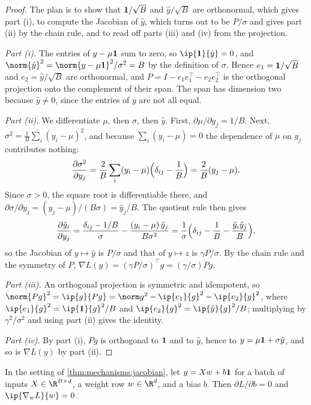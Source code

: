 \begin{refsection}
\begin{proof}
The plan is to show that $\mathbf{1}/\sqrt B$ and $\hat y/\sqrt B$ are orthonormal, which gives part (i), to compute the Jacobian of $\hat y$, which turns out to be $P/\sigma$ and gives part (ii) by the chain rule, and to read off parts (iii) and (iv) from the projection.

\emph{Part (i).} The entries of $y-\mu\mathbf{1}$ sum to zero, so $\ip{\mechanismsones}{\hat y}=0$, and $\norm{\hat y}^2=\norm{y-\mu\mechanismsones}^2/\sigma^2=B$ by the definition of $\sigma$. Hence $e_1=\mathbf{1}/\sqrt B$ and $e_2=\hat y/\sqrt B$ are orthonormal, and $P=I-e_1e_1^\top-e_2e_2^\top$ is the orthogonal projection onto the complement of their span. The span has dimension two because $\hat y\neq0$, since the entries of $y$ are not all equal.

\emph{Part (ii).} We differentiate $\mu$, then $\sigma$, then $\hat y$. First, $\partial\mu/\partial y_j=1/B$. Next, $\sigma^2=\frac1B\sum_i(y_i-\mu)^2$, and because $\sum_i(y_i-\mu)=0$ the dependence of $\mu$ on $y_j$ contributes nothing:
\[
\frac{\partial\sigma^2}{\partial y_j}=\frac2B\sum_i(y_i-\mu)\Bigl(\delta_{ij}-\frac1B\Bigr)=\frac2B(y_j-\mu).
\]
Since $\sigma>0$, the square root is differentiable there, and $\partial\sigma/\partial y_j=(y_j-\mu)/(B\sigma)=\hat y_j/B$. The quotient rule then gives
\[
\frac{\partial\hat y_i}{\partial y_j}=\frac{\delta_{ij}-1/B}{\sigma}-\frac{(y_i-\mu)\,\hat y_j}{B\sigma^2}=\frac1\sigma\Bigl(\delta_{ij}-\frac1B-\frac{\hat y_i\hat y_j}B\Bigr),
\]
so the Jacobian of $y\mapsto\hat y$ is $P/\sigma$ and that of $y\mapsto z$ is $\gamma P/\sigma$. By the chain rule and the symmetry of $P$, $\nabla L(y)=(\gamma P/\sigma)^\top g=(\gamma/\sigma)Pg$.

\emph{Part (iii).} An orthogonal projection is symmetric and idempotent, so $\norm{Pg}^2=\ip{g}{Pg}=\norm g^2-\ip{e_1}{g}^2-\ip{e_2}{g}^2$, where $\ip{e_1}{g}^2=\ip{\mechanismsones}{g}^2/B$ and $\ip{e_2}{g}^2=\ip{\hat y}{g}^2/B$; multiplying by $\gamma^2/\sigma^2$ and using part (ii) gives the identity.

\emph{Part (iv).} By part (i), $Pg$ is orthogonal to $\mathbf{1}$ and to $\hat y$, hence to $y=\mu\mathbf{1}+\sigma\hat y$, and so is $\nabla L(y)$ by part (ii).
\end{proof}

\begin{corollary}\label{cor:mechanisms:rows}
In the setting of \cref{thm:mechanisms:jacobian}, let $y=Xw+b\mathbf{1}$ for a batch of inputs $X\in\R^{B\times d}$, a weight row $w\in\R^d$, and a bias $b$. Then $\partial L/\partial b=0$ and $\ip{\nabla_wL}{w}=0$.
\end{corollary}


\end{refsection}
